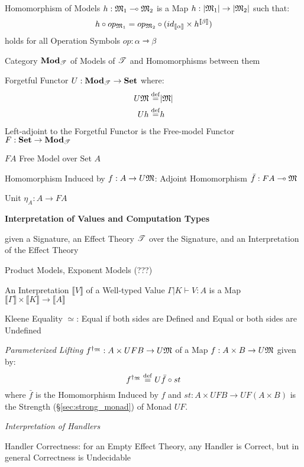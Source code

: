 Homomorphism of Models $h : \mathfrak{M}_1 \multimap \mathfrak{M}_2$ is a
Map $h : |\mathfrak{M}_1| \rightarrow |\mathfrak{M}_2|$ such that:
\[
  h \circ op_{\mathfrak{M}_1} = op_{\mathfrak{M}_2} \circ
    (id_{\llbracket \alpha \rrbracket}
      \times h^{\llbracket \beta \rrbracket})
\]
holds for all Operation Symbols $op:\alpha \rightarrowtriangle \beta$

Category $\mathbf{Mod}_\mathscr{T}$ of Models of $\mathscr{T}$ and Homomorphisms
between them

Forgetful Functor $U : \mathbf{Mod}_\mathscr{T} \rightarrow \mathbf{Set}$ where:
\[
  \begin{split}
    U \mathfrak{M} \stackrel{\mathrm{def}}= & |\mathfrak{M}| \\
    U h \stackrel{\mathrm{def}}= & h
  \end{split}
\]
Left-adjoint to the Forgetful Functor is the Free-model Functor $F :
\mathbf{Set} \rightarrow \mathbf{Mod}_\mathscr{T}$

$F A$ Free Model over Set $A$

Homomorphism Induced by $f : A \rightarrow U \mathfrak{M}$: Adjoint
Homomorphism $\bar{f} : F A \multimap \mathfrak{M}$

Unit $\eta_A : A \rightarrow F A$


\textbf{Interpretation of Values and Computation Types}

given a Signature, an Effect Theory $\mathscr{T}$ over the Signature, and
an Interpretation of the Effect Theory

Product Models, Exponent Models (???) %

An Interpretation $\llbracket V \rrbracket$ of a Well-typed Value
$\Gamma | K \vdash V:A$ is a Map $\llbracket \Gamma \rrbracket \times
\llbracket K \rrbracket \rightarrow \llbracket A \rrbracket$

Kleene Equality $\simeq$: Equal if both sides are Defined and Equal or
both sides are Undefined %

\emph{Parameterized Lifting} $f^{\dagger_\mathfrak{M}} : A
\times U F B \rightarrow U \mathfrak{M}$ of a Map $f : A \times B
\rightarrow U \mathfrak{M}$ given by:
\[
  f^{\dagger_\mathfrak{M}} \stackrel{\mathrm{def}}= U \bar{f} \circ st
\]
where $\bar{f}$ is the Homomorphism Induced by $f$ and $st : A \times
U F B \rightarrow U F (A \times B)$ is the Strength
(\S\ref{sec:strong_monad}) of Monad $U F$.


\emph{Interpretation of Handlers}

Handler Correctness: for an Empty Effect Theory, any Handler is
Correct, but in general Correctness is Undecidable

